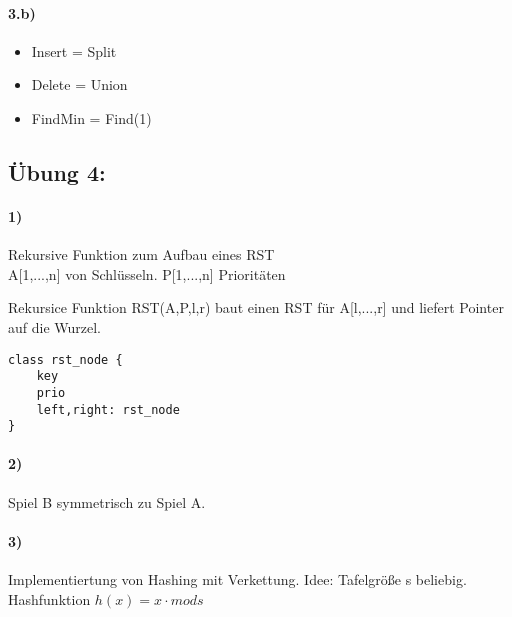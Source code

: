 \paragraph{3.b)} 
\begin{itemize}
    \item Insert = Split
    \item Delete = Union
    \item FindMin = Find(1)
\end{itemize}

\subsection*{Übung 4:}
\paragraph{1)} Rekursive Funktion zum Aufbau eines RST \\
A[1,...,n] von Schlüsseln. P[1,...,n] Prioritäten

\begin{algorithm}
\end{algorithm}

Rekursice Funktion RST(A,P,l,r) baut einen RST für A[l,...,r] und liefert Pointer auf die Wurzel.

\begin{verbatim}
class rst_node {
    key
    prio
    left,right: rst_node
}
\end{verbatim}

\begin{algorithm}
\end{algorithm}




\paragraph{2)}
Spiel B symmetrisch zu Spiel A.

\paragraph{3)} Implementiertung von Hashing mit Verkettung. Idee:
Tafelgröße s beliebig. Hashfunktion $ h(x) = x \cdot mod s $\\
\begin{algorithm}[H]
\end{algorithm}

